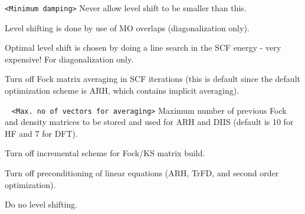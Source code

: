 \begin{description}
\verb|<Minimum damping>|\newline
Never allow level shift to be smaller than this.
\item[\Key{MOCHANGE}] Level shifting is done by use of MO overlaps (diagonalization only).
\item[\Key{MUOPT}] Optimal level shift is chosen by doing a line search in the SCF energy - very expensive! For diagonalization only.
\item[\Key{NOAV}] Turn off Fock matrix averaging in SCF iterations (this is default since the default optimization scheme is ARH, which contains implicit averaging).
\item[\Key{NVEC}] \verb| | \newline
\verb|<Max. no of vectors for averaging>|\newline
Maximum number of previous Fock and density matrices to be stored and used for ARH and DIIS (default is 10 for HF and 7 for DFT).
\item[\Key{NOINCREM}] Turn off incremental scheme for Fock/KS matrix build.
\item[\Key{NOPREC}] Turn off preconditioning of linear equations (ARH, TrFD, and second order optimization).
\item[\Key{NOSHIFT}] Do no level shifting.

\end{description}
